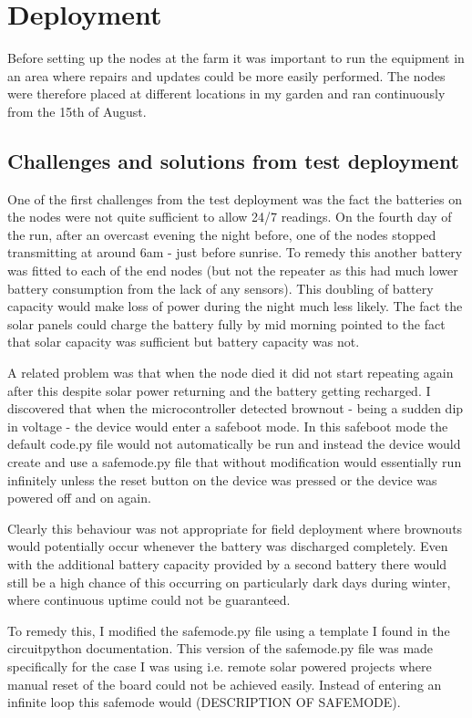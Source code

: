 \section{Deployment}

Before setting up the nodes at the farm it was important to run the equipment in
an area where repairs and updates could be more easily performed. The nodes were
therefore placed at different locations in my garden and ran continuously from
the 15th of August.

\subsection{Challenges and solutions from test deployment}

One of the first challenges from the test deployment was the fact the batteries
on the nodes were not quite sufficient to allow 24/7 readings. On the fourth day
of the run, after an overcast evening the night before, one of the nodes stopped
transmitting at around 6am - just before sunrise. To remedy this another battery
was fitted to each of the end nodes (but not the repeater as this had much lower
battery consumption from the lack of any sensors). This doubling of battery
capacity would make loss of power during the night much less likely. The fact
the solar panels could charge the battery fully by mid morning pointed to the
fact that solar capacity was sufficient but battery capacity was not.

A related problem was that when the node died it did not start repeating again
after this despite solar power returning and the battery getting recharged. I
discovered that when the microcontroller detected brownout - being a sudden dip
in voltage - the device would enter a safeboot mode. In this safeboot mode the
default code.py file would not automatically be run and instead the device would
create and use a safemode.py file that without modification would essentially
run infinitely unless the reset button on the device was pressed or the device
was powered off and on again.

Clearly this behaviour was not appropriate for field deployment where brownouts
would potentially occur whenever the battery was discharged completely. Even
with the additional battery capacity provided by a second battery there would
still be a high chance of this occurring on particularly dark days during
winter, where continuous uptime could not be guaranteed.

To remedy this, I modified the safemode.py file using a template I found in the
circuitpython documentation. This version of the safemode.py file was made
specifically for the case I was using i.e. remote solar powered projects where
manual reset of the board could not be achieved easily. Instead of entering an
infinite loop this safemode would (DESCRIPTION OF SAFEMODE).


